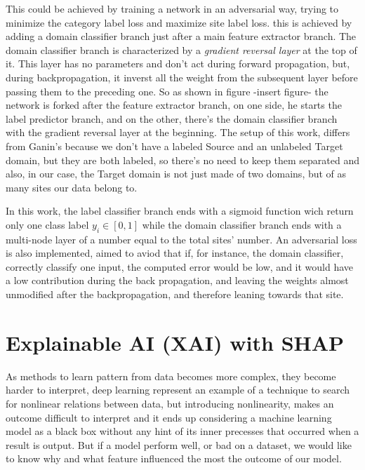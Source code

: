 \documentclass[a4paper,11pt]{article}
\begin{document}
This could be achieved by training a network in an adversarial way, trying to minimize the category label loss and maximize site label loss.
this is achieved by adding a domain classifier branch just after a main feature extractor branch.
The domain classifier branch is characterized by a \emph{gradient reversal layer} at the top of it.
This layer has no parameters and don't act during forward propagation, but, during backpropagation, it inverst all the weight from the subsequent layer before passing them to the preceding one.
So as shown in figure -insert figure- the network is forked after the feature extractor branch, on one side, he starts the label predictor branch, and on the other, there's the domain classifier branch with the gradient reversal layer at the beginning.
The setup of this work, differs from Ganin's because we don't have a labeled Source and an unlabeled Target domain, but they are both labeled, so there's no need to keep them separated and also, in our case, the Target domain is not just made of two domains, but of as many sites our data belong to.


In this work, the label classifier branch ends with a sigmoid function wich return only one class label $y_i \in [0, 1]$ while the domain classifier branch ends with a multi-node layer of a number equal to the total sites' number.
An adversarial loss is also implemented, aimed to aviod that if, for instance, the domain classifier, correctly classify one input, the computed error would be low, and it would have a low contribution during the back propagation, and leaving the weights almost unmodified after the backpropagation, and therefore leaning towards that site.





\section{Explainable AI (XAI) with SHAP}

As methods to learn pattern from data becomes more complex, they become harder to interpret, deep learning represent an example of a technique to search for nonlinear relations between data, but introducing nonlinearity, makes an outcome difficult to interpret and it ends up considering a machine learning model as a black box without any hint of its inner precesses that occurred when a result is output. But if a model perform well, or bad on a dataset, we would like to know why and what feature influenced the most the outcome of our model.
\end{document}
